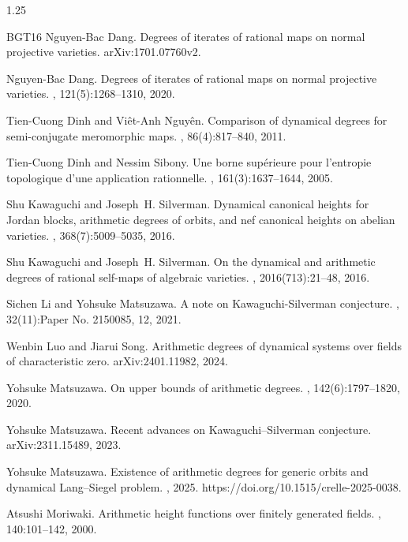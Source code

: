 \documentclass[12pt]{amsart}
\begin{document}
\begin{spacing}{1.25}
\begin{thebibliography}{BGT16}
Nguyen-Bac Dang.
\newblock Degrees of iterates of rational maps on normal projective varieties.
\newblock arXiv:1701.07760v2.

Nguyen-Bac Dang.
\newblock Degrees of iterates of rational maps on normal projective varieties.
, 121(5):1268--1310, 2020.

Tien-Cuong Dinh and Vi\^et-Anh Nguy\^en.
\newblock Comparison of dynamical degrees for semi-conjugate meromorphic maps.
, 86(4):817--840, 2011.

Tien-Cuong Dinh and Nessim Sibony.
\newblock Une borne sup\'erieure pour l'entropie topologique d'une application
  rationnelle.
, 161(3):1637--1644, 2005.

Shu Kawaguchi and Joseph~H. Silverman.
\newblock Dynamical canonical heights for {J}ordan blocks, arithmetic degrees
  of orbits, and nef canonical heights on abelian varieties.
, 368(7):5009--5035, 2016.

Shu Kawaguchi and Joseph~H. Silverman.
\newblock On the dynamical and arithmetic degrees of rational self-maps of
  algebraic varieties.
, 2016(713):21--48, 2016.

Sichen Li and Yohsuke Matsuzawa.
\newblock A note on {K}awaguchi-{S}ilverman conjecture.
, 32(11):Paper No. 2150085, 12, 2021.

Wenbin Luo and Jiarui Song.
\newblock Arithmetic degrees of dynamical systems over fields of characteristic
  zero.
\newblock arXiv:2401.11982, 2024.

Yohsuke Matsuzawa.
\newblock On upper bounds of arithmetic degrees.
, 142(6):1797--1820, 2020.

Yohsuke Matsuzawa.
\newblock Recent advances on {K}awaguchi--{S}ilverman conjecture.
\newblock arXiv:2311.15489, 2023.

Yohsuke Matsuzawa.
\newblock Existence of arithmetic degrees for generic orbits and dynamical
  {L}ang--{S}iegel problem.
, 2025.
\newblock https://doi.org/10.1515/crelle-2025-0038.

Atsushi Moriwaki.
\newblock Arithmetic height functions over finitely generated fields.
, 140:101--142, 2000.


\end{thebibliography}
\end{spacing}
\end{document}
